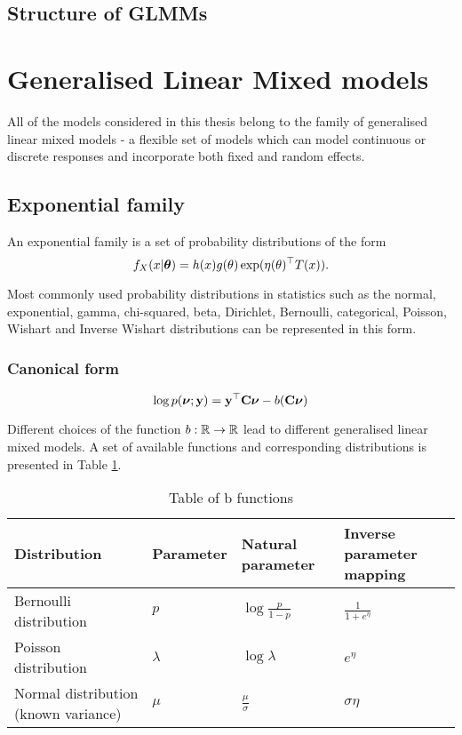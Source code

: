 \subsection{Structure of GLMMs}

\section{Generalised Linear Mixed models}
All of the models considered in this thesis belong to the family of generalised linear mixed models - a
flexible set of models which can model continuous or discrete responses and incorporate both fixed and
random effects.

\subsection{Exponential family}

An exponential family is a set of probability distributions of the form
\[
	f_X(x|{\boldsymbol \theta}) = h(x) g(\theta) \exp(\eta(\theta)^\top T(x)).
\]

Most commonly used probability distributions in statistics such as the normal, exponential, gamma,
chi-squared, beta, Dirichlet, Bernoulli, categorical, Poisson, Wishart and Inverse Wishart distributions can
be represented in this form.

\subsubsection{Canonical form}
\[
	\log p({\boldsymbol \nu}; {\bf y}) = {\bf y}^\top {\bf C} {\boldsymbol\nu} - b({\bf C} {\boldsymbol \nu})
\]

Different choices of the function $b:{\mathbb{R}} \to {\mathbb{R}}$ lead to different generalised linear mixed models. A set
of available functions and corresponding distributions is presented in Table \ref{tab:b_functions}.

\begin{table}
	\caption{Table of b functions}
	\label{tab:b_functions}
	\begin{tabular}{|l|lll|}
		\hline
		Distribution                         & Parameter & Natural parameter       & Inverse parameter mapping \\
		\hline
		Bernoulli distribution               & $p$       & $\log{\frac{p}{1 - p}}$ & $\frac{1}{1 + e^\eta}$    \\
		Poisson distribution                 & $\lambda$ & $\log \lambda$          & $e^\eta$                  \\
		Normal distribution (known variance) & $\mu$     & $\frac{\mu}{\sigma}$    & $\sigma \eta$             \\
		\hline
	\end{tabular}
\end{table}

